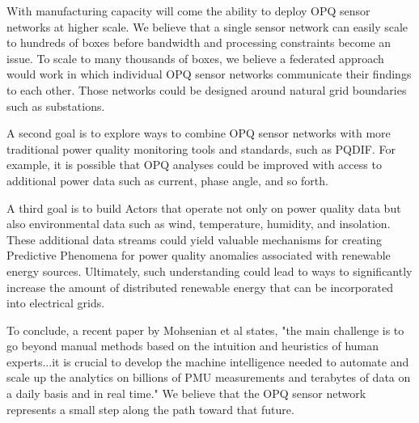 With manufacturing capacity will come the ability to deploy OPQ sensor networks at higher scale. We believe that a single sensor network can easily scale to hundreds of boxes before bandwidth and processing constraints become an issue. To scale to many thousands of boxes, we believe a federated approach would work in which individual OPQ sensor networks communicate their findings to each other. Those networks could be designed around natural grid boundaries such as substations.

A second goal is to explore ways to combine OPQ sensor networks with more traditional power quality monitoring tools and standards, such as PQDIF. For example, it is possible that OPQ analyses could be improved with access to additional power data such as current, phase angle, and so forth.

A third goal is to build Actors that operate not only on power quality data but also environmental data such as wind, temperature, humidity, and insolation.  These additional data streams could yield valuable mechanisms for creating Predictive Phenomena for power quality anomalies associated with renewable energy sources. Ultimately, such understanding could lead to ways to significantly increase the amount of distributed renewable energy that can be incorporated into electrical grids.

To conclude, a recent paper by Mohsenian et al \cite{mohsenian-rad_distribution_2018} states, "the main challenge is to go beyond manual methods based on the intuition and heuristics of human experts...it is crucial to develop the machine intelligence needed to automate and scale up the analytics on billions of PMU measurements and terabytes of data on a daily basis and in real time." We believe that the OPQ sensor network represents a small step along the path toward that future.



